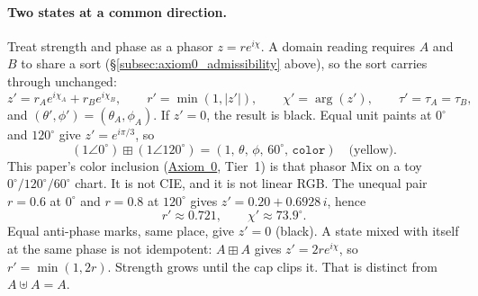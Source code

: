 \documentclass[12pt, a4paper]{article}
\begin{document}
\paragraph{Two states at a common direction.}
Treat strength and phase as a phasor $z=r e^{i\chi}$. A domain reading
requires $A$ and $B$ to share a sort (\S\ref{subsec:axiom0_admissibility}
above), so the sort carries through unchanged:
\begin{equation}
    z' = r_A e^{i\chi_A} + r_B e^{i\chi_B},
    \qquad
    r' = \min(1,|z'|),
    \qquad
    \chi' = \arg(z'),
    \qquad
    \tau' = \tau_A = \tau_B,
    \label{eq:interference_formal}
\end{equation}
and $(\theta',\phi')=(\theta_A,\phi_A)$. If $z'=0$, the result is
black. Equal unit paints at $0^\circ$ and $120^\circ$ give
$z'=e^{i\pi/3}$, so
\[
(1\angle 0^\circ)\boxplus(1\angle 120^\circ)
=(1,\,\theta,\,\phi,\,60^\circ,\,\mathtt{color})
\quad\text{(yellow)}.
\]
This paper's color inclusion
(\hyperref[subsec:axiom0_admissibility]{Axiom~0}, Tier~1) is that phasor Mix
on a toy $0^\circ/120^\circ/60^\circ$ chart. It is not CIE, and it is
not linear RGB.
The unequal pair $r=0.6$ at $0^\circ$ and $r=0.8$ at $120^\circ$
gives $z'=0.20+0.6928\,i$, hence
\[
r'\approx 0.721,\qquad \chi'\approx 73.9^\circ.
\]
Equal anti-phase marks, same place, give $z'=0$ (black).
A state mixed with itself at the same phase is not idempotent:
$A\boxplus A$ gives $z'=2r e^{i\chi}$, so $r'=\min(1,2r)$.
Strength grows until the cap clips it. That is distinct from
$A\uplus A=A$.
\end{document}
